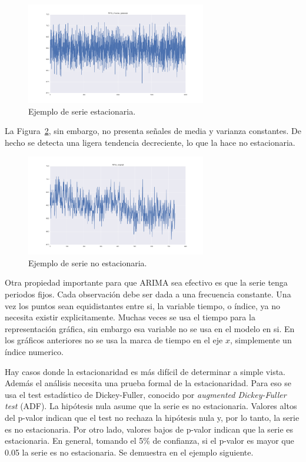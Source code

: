 \documentclass[11pt,spanish,listoffigures,listoftables]{tfgetsinf}
\begin{document}
    \begin{figure}[h]
        \centering
        \includegraphics[width=0.7\textwidth]{APVs_inverse_gaussian.png}
        \caption{Ejemplo de serie estacionaria.}
        \label{fig:stationary}
    \end{figure}

    La Figura~\ref{fig:non_stationary}, sin embargo, no presenta señales de media y varianza constantes. De hecho se detecta una ligera tendencia decreciente, lo que la hace no estacionaria. 
    
    \begin{figure}[h]
        \centering
        \includegraphics[width=0.7\textwidth]{APVs_original.png}
        \caption{Ejemplo de serie no estacionaria.}
        \label{fig:non_stationary}
    \end{figure}
    
    Otra propiedad importante para que ARIMA sea efectivo es que la serie tenga periodos fijos. Cada observación debe ser dada a una frecuencia constante. Una vez los puntos sean equidistantes entre si, la variable tiempo, o índice, ya no necesita existir explicitamente. Muchas veces se usa el tiempo para la representación gráfica, sin embargo esa variable no se usa en el modelo en si. En los gráficos anteriores no se usa la marca de tiempo en el eje \(x\), simplemente un índice numerico. 
    
    Hay casos donde la estacionaridad es más difícil de determinar a simple vista. Además el análisis necesita una prueba formal de la estacionaridad. Para eso se usa el test estadístico de Dickey-Fuller, conocido por {\em augmented Dickey-Fuller test} (ADF). La hipótesis nula asume que la serie es no estacionaria. Valores altos del p-valor indican que el test no rechaza la hipótesis nula y, por lo tanto, la serie es no estacionaria. Por otro lado, valores bajos de p-valor indican que la serie es estacionaria. En general, tomando el 5\% de confianza, si el p-valor es mayor que 0.05 la serie es no estacionaria. Se demuestra en el ejemplo siguiente.
    
\end{document}
